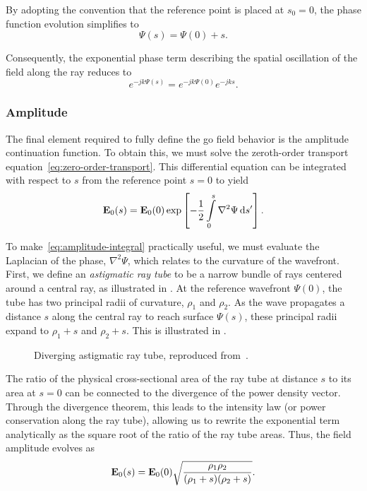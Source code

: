 By adopting the convention that the reference point is placed at $s_0 = 0$, the phase function evolution simplifies to
\begin{equation}
  \Psi(s) = \Psi(0) + s.
\end{equation}

Consequently, the exponential phase term describing the spatial oscillation of the field along the ray reduces to
\begin{equation}
  e^{-jk\Psi(s)} = e^{-jk\Psi(0)} e^{-jks}.
\end{equation}

\subsubsection{Amplitude}

The final element required to fully define the \gls{go} field behavior is the amplitude continuation function. To obtain this, we must solve the zeroth-order transport equation~\eqref{eq:zero-order-transport}. This differential equation can be integrated with respect to $s$ from the reference point $s=0$ to yield
\begin{equation}\label{eq:amplitude-integral}
  \mathbf{E}_0(s) = \mathbf{E}_0(0) \exp\left[ -\frac{1}{2} \int\limits_{0}^{s} \nabla^2 \Psi \, \mathrm{d}s' \right].
\end{equation}

To make~\eqref{eq:amplitude-integral} practically useful, we must evaluate the Laplacian of the phase, $\nabla^2 \Psi$, which relates to the curvature of the wavefront. First, we define an \emph{astigmatic ray tube} to be a narrow bundle of rays centered around a central ray, as illustrated in . At the reference wavefront $\Psi(0)$, the tube has two principal radii of curvature, $\rho_1$ and $\rho_2$. As the wave propagates a distance $s$ along the central ray to reach surface $\Psi(s)$, these principal radii expand to $\rho_1 + s$ and $\rho_2 + s$. This is illustrated in .

\begin{figure}
  \centering
  \caption{Diverging astigmatic ray tube, reproduced from~\cite[Fig.~2.4]{McNamara1990}.}
\end{figure}

The ratio of the physical cross-sectional area of the ray tube at distance $s$ to its area at $s=0$ can be connected to the divergence of the power density vector. Through the divergence theorem, this leads to the intensity law (or power conservation along the ray tube), allowing us to rewrite the exponential term analytically as the square root of the ratio of the ray tube areas. Thus, the field amplitude evolves as
\begin{equation}
  \mathbf{E}_0(s) = \mathbf{E}_0(0) \sqrt{\frac{\rho_1 \rho_2}{(\rho_1 + s)(\rho_2 + s)}}.
\end{equation}

